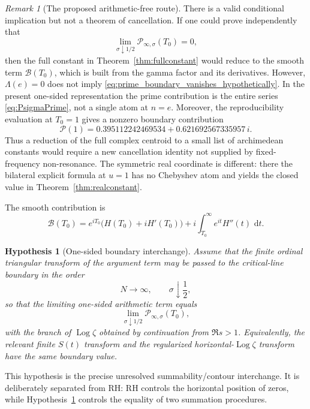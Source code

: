 \documentclass[11pt]{amsart}
\numberwithin{equation}{section}
\newtheorem{hypothesis}[theorem]{Hypothesis}
\theoremstyle{definition}
\theoremstyle{remark}
\newtheorem{remark}[theorem]{Remark}
\newcommand{\dd}{\,\mathrm d}
\newcommand{\Log}{\operatorname{Log}}
\newcommand{\cP}{\mathcal P}
\newcommand{\cB}{\mathcal B}
\begin{document}
\begin{remark}[The proposed arithmetic-free route]\label{rem:arithmetic_free_route}
There is a valid conditional implication but not a theorem of cancellation.  If one could prove independently that
\begin{equation}\label{eq:prime_boundary_vanishes_hypothetically}
\lim_{\sigma\downarrow1/2}\cP_{\infty,\sigma}(T_0)=0,
\end{equation}
then the full constant in Theorem~\ref{thm:fullconstant} would reduce to the smooth term $\cB(T_0)$, which is built from the gamma factor and its derivatives.  However, $\Lambda(e)=0$ does not imply \eqref{eq:prime_boundary_vanishes_hypothetically}.  In the present one-sided representation the prime contribution is the entire series \eqref{eq:PsigmaPrime}, not a single atom at $n=e$.  Moreover, the reproducibility evaluation at $T_0=1$ gives a nonzero boundary contribution
\begin{equation}\label{eq:prime_boundary_numeric}
\cP(1)=0.395112242469534+0.621692567335957\,i.
\end{equation}
Thus a reduction of the full complex centroid to a small list of archimedean constants would require a new cancellation identity not supplied by fixed-frequency non-resonance.  The symmetric real coordinate is different: there the bilateral explicit formula at $u=1$ has no Chebyshev atom and yields the closed value in Theorem~\ref{thm:realconstant}.
\end{remark}

The smooth contribution is
\begin{equation}\label{eq:Bsmooth}
\cB(T_0)
=e^{iT_0}\bigl(H(T_0)+iH'(T_0)\bigr)
+i\int_{T_0}^{\infty}e^{it}H''(t)\,\dd t.
\end{equation}

\begin{hypothesis}[One-sided boundary interchange]\label{hyp:BI}
Assume that the finite ordinal triangular transform of the argument term may be passed to the critical-line boundary in the order
\[
N\to\infty,
\qquad \sigma\downarrow\frac12,
\]
so that the limiting one-sided arithmetic term equals
\[
\lim_{\sigma\downarrow1/2}\cP_{\infty,\sigma}(T_0),
\]
with the branch of $\Log\zeta$ obtained by continuation from $\Re s>1$.  Equivalently, the relevant finite $S(t)$ transform and the regularized horizontal-$\Log\zeta$ transform have the same boundary value.
\end{hypothesis}

This hypothesis is the precise unresolved summability/contour interchange.  It is deliberately separated from RH: RH controls the horizontal position of zeros, while Hypothesis~\ref{hyp:BI} controls the equality of two summation procedures.
\end{document}
